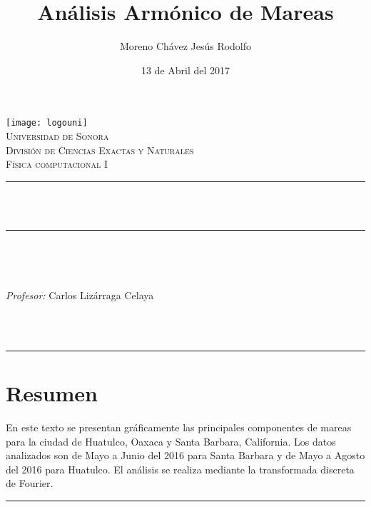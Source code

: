 \documentclass[12pt]{article}
\title{Análisis Armónico de Mareas}		%
\author{\centering Moreno Chávez Jesús Rodolfo}											%
\date{13 de Abril del 2017} %
\makeatletter
\let\thetitle\@title
\let\theauthor\@author
\let\thedate\@date
\makeatother
\begin{document}

\begin{titlepage}
	\centering
    \vspace*{0.5 cm}
    \texttt{[image: logouni]}\\[0.5 cm]	%
    \textsc{\Large Universidad de Sonora}\\[1.0 cm]	%
	\textsc{\Large División de Ciencias Exactas y Naturales}\\[0.5 cm]				%
	\textsc{\large Física computacional I}\\[0.5 cm]				%
	\rule{\linewidth}{0.2 mm} \\[0.4 cm]
	{ \huge \bfseries \thetitle}\\
	\rule{\linewidth}{0.2 mm} \\[0.5 cm]
	
	\begin{minipage}{\textwidth}
		\begin{flushleft} 
			\emph{\Large} \large \\
			\theauthor
			\end{flushleft}
	
		\begin{flushleft} 
			\emph{\Large Profesor:} \large \centering Carlos Lizárraga Celaya 	
			\end{flushleft}
	\end{minipage}\\[1 cm]
	{\large \thedate}\\[2 cm]
 
	\vfill
	
\end{titlepage}

\newpage
\hrule 
\section*{Resumen}
En este texto se presentan gráficamente las principales componentes de mareas para la ciudad de Huatulco, Oaxaca
y Santa Barbara, California. Los datos analizados son de Mayo a Junio del 2016 para Santa Barbara y de Mayo a Agosto del 2016 para Huatulco. El análisis se realiza mediante la transformada discreta de Fourier.
\vspace{0.5 cm}
\hrule
\vspace{0.9 cm}
\end{document}
